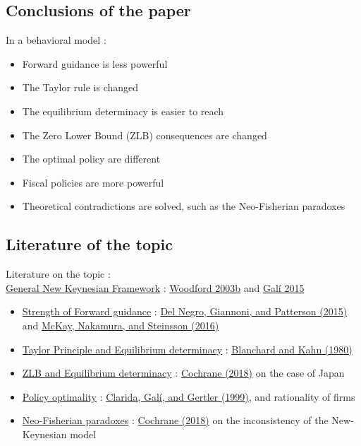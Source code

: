 \documentclass{beamer}
\begin{document}
\subsection{Conclusions of the paper}
\begin{frame}{\subsecname}
    In a behavioral model :
    \begin{itemize}
        \item Forward guidance is less powerful
        \item The Taylor rule is changed
        \item The equilibrium determinacy is easier to reach
        \item The Zero Lower Bound (ZLB) consequences are changed
        \item The optimal policy are different
        \item Fiscal policies are more powerful
        \item Theoretical contradictions are solved, such as the Neo-Fisherian paradoxes
    \end{itemize}
\end{frame}

\subsection{Literature of the topic}
\begin{frame}{\subsecname}
    Literature on the topic : \\
    \underline{General New Keynesian Framework} : \hyperlink{https://press.princeton.edu/books/hardcover/9780691010496/interest-and-prices}{Woodford 2003b} and \hyperlink{https://perhuaman.files.wordpress.com/2014/06/gali_polc3adtica_monetaria.pdf}{Galí 2015} \\
    \begin{itemize}
        \item \underline{Strength of Forward guidance} : \hyperlink{https://www.newyorkfed.org/medialibrary/media/research/staff_reports/sr574.pdf}{Del Negro, Giannoni, and Patterson (2015)} and \hyperlink{https://www.aeaweb.org/articles?id=10.1257/aer.20150063}{McKay, Nakamura, and Steinsson (2016)}
        \item \underline{Taylor Principle and Equilibrium determinacy} : \hyperlink{https://www.jstor.org/stable/1912186}{Blanchard and Kahn (1980)}
        \item \underline{ZLB and Equilibrium determinacy} : \hyperlink{https://static1.squarespace.com/static/5e6033a4ea02d801f37e15bb/t/5ee1519d8301bb4c205c46d3/1591824801214/320201.email.pdf}{Cochrane (2018)} on the case of Japan
        \item \underline{Policy optimality} : \hyperlink{https://www.jstor.org/stable/2565488}{Clarida, Galí, and Gertler (1999)}, and rationality of firms
        \item \underline{Neo-Fisherian paradoxes} : \hyperlink{https://static1.squarespace.com/static/5e6033a4ea02d801f37e15bb/t/5ee1519d8301bb4c205c46d3/1591824801214/320201.email.pdf}{Cochrane (2018)} on the inconsistency of the New-Keynesian model
    \end{itemize}
\end{frame}
\end{document}
